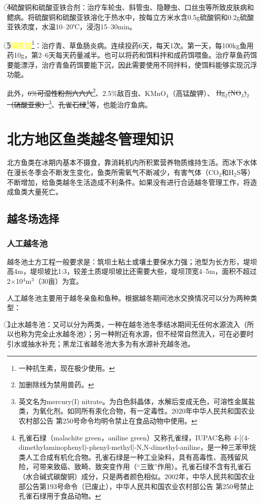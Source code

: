 \documentclass{ctexbook}
\begin{document}
\textcircled{4}硫酸铜和硫酸亚铁合剂：治疗车轮虫、斜管虫、隐鞭虫、口丝虫等所致皮肤病和鳃病。将硫酸铜和硫酸亚铁溶化于热水中，按每立方米水含0.5g硫酸铜和0.2g硫酸亚铁浓度，水温10--20℃，浸泡15--30min。

\textcircled{5}\textcolor{yellow}{磺胺胍}\footnote{一种抗生素，现在极少使用。}：治疗青、草鱼肠炎病。连续投药6天，每天1次。第一天，每100kg鱼用药10g，第2--6天每天药量减半。也可以将药和饵料拌和成药饵喂鱼。治疗草鱼药饵要能漂浮，治疗青鱼药饵要能下沉，因此需要使用不同拌料，使饵料能够实现沉浮功能。

此外，\sout{6\%可湿性粉剂六六六}\footnote{加删除线为禁用兽药。}、2.5\%敌百虫、KMnO$_4$（高锰酸钾）、\sout{ Hg$_2$(NO$_3$)$_2$（硝酸亚汞）}\footnote{英文名为mercury(I) nitrate。为白色斜晶体，水解后变成无色，可溶性金属盐类，为氧化剂。如同所有汞化合物，有一定毒性。2020年中华人民共和国农业农村部公告 第250号命令均明令禁止在食品动物中使用。}、\sout{孔雀石绿}\footnote{孔雀石绿（malachite green，aniline green）又称孔雀绿，IUPAC名称 4-[(4-dimethylaminophenyl)-phenyl-methyl]-N,N-dimethyl-aniline，是一种三苯甲烷类人工合成有机化合物。孔雀石绿是一种工业染料，具有高毒性、高残留风险，可带来致癌、致畸、致突变作用（“三致”作用）。孔雀石绿不含有孔雀石（水合碱式碳酸铜）成分，只是两者颜色相似。2002年，中华人民共和国农业部公告第193号命令（已废止），中华人民共和国农业农村部公告 第250号禁止孔雀石绿用于食品动物。}等，也能治疗鱼病。
\section{北方地区鱼类越冬管理知识}
北方鱼类在冰期内基本不摄食，靠消耗机内所积累营养物质维持生活。而冰下水体在漫长冬季会不断发生变化，鱼类所需氧气不断减少，有害气体（CO$_2$和H$_2$S等）不断增加，给鱼类越冬生活造成不利条件。如果没有进行合适越冬管理工作，将造成鱼类大量死亡。
\subsection{越冬场选择}
\subsubsection{人工越冬池}
越冬池土方工程一般要求是：筑坝土粘土或壤土要保水力强；池型为长方形，堤坝高4m，堤坝坡比1:3，较差土质堤坝坡比还需要大些，堤坝顶宽4--5m，面积不超过2$\times$10$^{4}$m$^{3}$（30亩）为宜。

人工越冬池主要用于越冬亲鱼和鱼种。根据越冬期间池水交换情况可以分为两种类型：

\textcircled{1}{\fangsong 止水越冬池}：又可以分为两类，一种在越冬池冬季结冰期间无任何水源流入（所以也称为完全止水越冬池）；另一种附近有水源，但不经常自然流入，可在必要时引水或抽水补充；黑龙江省越冬池大多为有水源补充越冬池。
\end{document}
